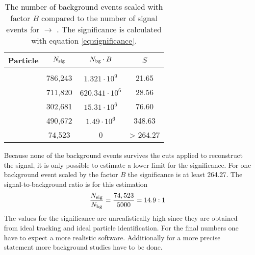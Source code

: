 \begin{table}
	\centering
	\caption{\propose The number of background events scaled with factor $B$ compared to the number of signal events for \pbarpSystem $\rightarrow$ \excitedcascade \anticascade.
		The significance is calculated with equation \ref{eq:significance}.}
	\label{bg_compared_reco_with_scaling}
	\begin{tabular}{lccc}
		\hline
		Particle & $N_{\textnormal{sig}}$ & $N_{\textnormal{bg}} \cdot B$ & $S$\\
		\hline
		\hline
		& & &\\
		\lam & 786,243 &$ 1.321 \cdot 10^{9}$& 21.65\\
		\alam & 711,820 & $620.341 \cdot 10^{6}$ & 28.56\\
		\anticascade & 302,681 & $15.31 \cdot 10^{6}$ & 76.60\\
		\excitedcascade &490,672  & $1.49 \cdot 10^{6}$& 348.63\\
		\excitedcascade \anticascade &  74,523 & 0 & > 264.27\\
		\hline
		 
		  
	\end{tabular}
\end{table}
Because none of the background events survives the cuts applied to reconstruct the signal, it is only possible to estimate a lower limit for the significance.
For one background event scaled by the factor $B$ the significance is at least 264.27.
The signal-to-background ratio is for this estimation
\begin{equation}
	\nonumber
	\frac{N_{\textnormal{sig}}}{N_{\textnormal{bg}}} = \frac{74,523} {5000} = 14.9 : 1
\end{equation}
The values for the significance are unrealistically high since they are obtained from ideal tracking and ideal particle identification.
For the final numbers one have to expect a more realistic software.
Additionally for a more precise statement more background studies have to be done.
 
	